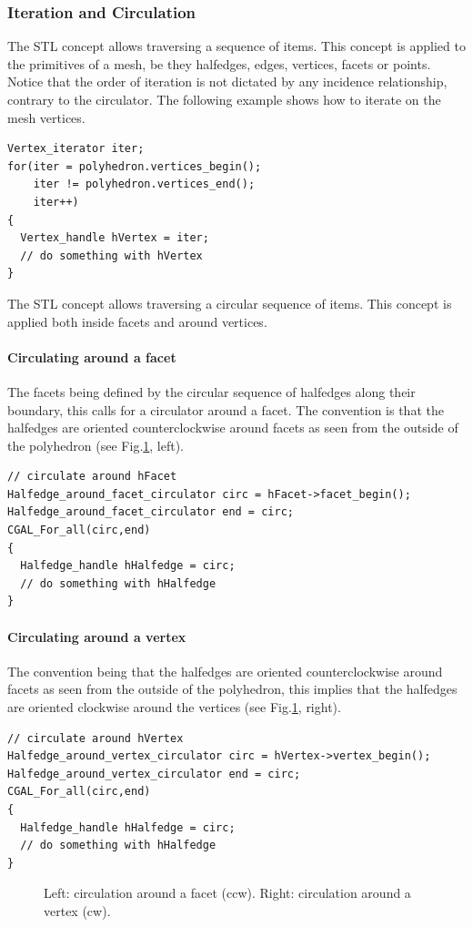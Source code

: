 \subsubsection{Iteration and Circulation}

The  STL concept allows traversing a sequence of
items. This concept is applied to the primitives of a mesh, be they
halfedges, edges, vertices, facets or points. Notice that the order of
iteration is not dictated by any incidence relationship, contrary to
the circulator. The following example shows how to iterate on the mesh
vertices.

{ \scriptsize
\begin{verbatim}
Vertex_iterator iter;
for(iter = polyhedron.vertices_begin();
    iter != polyhedron.vertices_end();
    iter++)
{
  Vertex_handle hVertex = iter;
  // do something with hVertex
}
\end{verbatim}}

The  STL concept allows traversing a circular
sequence of items. This concept is applied both inside facets and
around vertices. 

\paragraph{Circulating around a facet}
The facets being defined by the circular sequence of halfedges along
their boundary, this calls for a circulator around a facet. The
convention is that the halfedges are oriented counterclockwise around
facets as seen from the outside of the polyhedron (see
Fig.\ref{fig:stl_concept}, left).

{ \scriptsize
\begin{verbatim}
// circulate around hFacet
Halfedge_around_facet_circulator circ = hFacet->facet_begin();
Halfedge_around_facet_circulator end = circ;
CGAL_For_all(circ,end)
{
  Halfedge_handle hHalfedge = circ;
  // do something with hHalfedge
}
\end{verbatim}}

\paragraph{Circulating around a vertex}
The convention being that the halfedges are oriented counterclockwise
around facets as seen from the outside of the polyhedron, this implies
that the halfedges are oriented clockwise around the vertices (see
Fig.\ref{fig:stl_concept}, right).

{ \scriptsize
\begin{verbatim}
// circulate around hVertex
Halfedge_around_vertex_circulator circ = hVertex->vertex_begin();
Halfedge_around_vertex_circulator end = circ;
CGAL_For_all(circ,end)
{
  Halfedge_handle hHalfedge = circ;
  // do something with hHalfedge
}
\end{verbatim}}

\begin{figure}[htb]
    \caption{Left: circulation around a facet (ccw).
             Right: circulation around a vertex (cw).}  
    \label{fig:stl_concept}
\end{figure}
